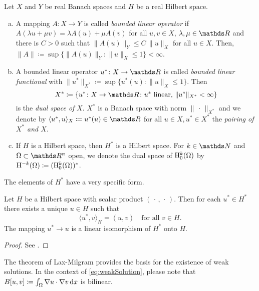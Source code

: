 \begin{defn}
  Let $X$ and $Y$ be real Banach spaces and $H$ be a real Hilbert space.
  \begin{enumerate}[a)]
    \item A mapping $A \colon X \to Y$ is called \emph{bounded linear operator} if $A(\lambda u + \mu v) = \lambda A(u) + \mu A(v)$ for all $u,v \in X$, $\lambda, \mu \in \R$ and there is $C> 0$ such that $\|A(u)\|_Y \leq C \, \|u\|_X$ for all $u \in X$.
      Then, $\|A\| \coloneqq \sup\{\|A(u)\|_Y \colon \|u\|_X \leq 1 \} < \infty$.
    \item A bounded linear operator $u^* \colon X \to \R$ is called \emph{bounded linear functional} with $\|u^*\|_{X^*} \coloneqq \sup\{u^*(u) \colon \|u\|_X \leq 1\}$.
      Then
      $$
      X^* \coloneqq \{ u^* \colon X \to \R \colon u^* \text{ linear, } \|u^*\|_{X^*} < \infty\}
      $$
      is the \emph{dual space of} $X$.
      $X^*$ is a Banach space with norm $\|\,\cdot\,\|_{X^*}$ and we denote by $\langle u^*, u\rangle_X \coloneqq u^*(u) \in \R$ for all $u \in X, u^* \in X^*$ the \emph{pairing of $X^*$ and $X$}.
    \item If $H$ is a Hilbert space, then $H^*$ is a Hilbert space.
      For $k \in \N$ and $\Omega \subset \R^n$ open, we denote the dual space of $\mathrm{H}_0^k(\Omega)$ by $\mathrm{H}^{-k}(\Omega) \coloneqq (\mathrm{H}_0^k(\Omega))^*$.
  \end{enumerate}
\end{defn}

The elements of $H^*$ have a very specific form.

\begin{thm}
  \label{thm:RieszFrechet}
  Let $H$ be a Hilbert space with scalar product $(\,\cdot\, , \,\cdot\,)$.
  Then for each $u^* \in H^*$ there exists a unique $u \in H$ such that
  $$
  \langle u^*, v \rangle_H = (u, v) \quad\text{for all } v \in H.
  $$
  The mapping $u^* \to u$ is a linear isomorphism of $H^*$ onto $H$.
\end{thm}

\begin{proof}
  See \cite[Satz 2.25]{dobrowolski2010angewandte}.
\end{proof}

The theorem of Lax-Milgram provides the basis for the existence of weak solutions.
In the context of \eqref{eq:weakSolution}, please note that $B[u,v] \coloneqq \int_\Omega \nabla u \cdot \nabla v \, {\operatorname{d}\!{x}}$ is bilinear.

